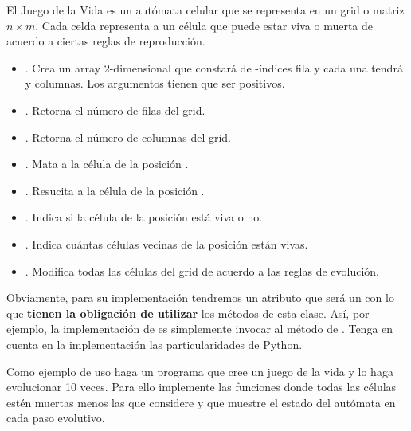 \begin{definition}{}\label{def:TDAJuegoVida}

El Juego de la Vida es un autómata celular que se representa en un grid o matriz $n\times m$.
Cada celda representa a un célula que puede estar viva o muerta de acuerdo a ciertas reglas de reproducción.

\begin{itemize}
\item {}. Crea un array 2-dimensional que constará de -índices fila y cada una tendrá y  columnas. Los argumentos tienen que ser positivos.


\item {}. Retorna el número de filas del grid.

\item {}. Retorna el número de columnas del grid.

\item {}. Mata a la célula de la posición .

\item {}. Resucita a la célula de la posición .

\item {}. Indica si la célula de la posición  está viva o no.


\item {}. Indica cuántas células vecinas de la posición 
 están vivas.

\item {}. Modifica todas las células del grid de acuerdo a las reglas de evolución.
\end{itemize}
\end{definition}

Obviamente, para su implementación tendremos un atributo que será un  con lo que \textbf{tienen la obligación de utilizar} los métodos de esta clase. Así, por ejemplo, la implementación de  es simplemente invocar al método  de . Tenga en cuenta en la implementación las particularidades de Python.


Como ejemplo de uso haga un programa que cree un juego de la vida y lo haga evolucionar 10 veces. Para ello implemente las funciones  donde todas las células estén muertas menos las que considere y  que muestre el estado del autómata en cada paso evolutivo.


